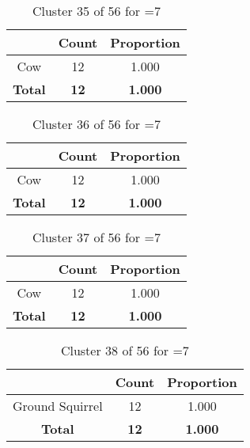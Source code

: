 \begin{table}[ht!]
\centering
\begin{tabular}{|c|c|c|}
\hline
\bf \Spec{} &\bf Count &\bf Proportion\\ \hline \hline
Cow & 12 & 1.000\\ \hline
\hline
\bf Total & \bf 12 & \bf 1.000\\ \hline
\end{tabular}
\label{tab:cluster:35:7}
\caption{Cluster 35 of 56 for \minneigh{}=7}
\end{table}

\begin{table}[ht!]
\centering
\begin{tabular}{|c|c|c|}
\hline
\bf \Spec{} &\bf Count &\bf Proportion\\ \hline \hline
Cow & 12 & 1.000\\ \hline
\hline
\bf Total & \bf 12 & \bf 1.000\\ \hline
\end{tabular}
\label{tab:cluster:36:7}
\caption{Cluster 36 of 56 for \minneigh{}=7}
\end{table}

\begin{table}[ht!]
\centering
\begin{tabular}{|c|c|c|}
\hline
\bf \Spec{} &\bf Count &\bf Proportion\\ \hline \hline
Cow & 12 & 1.000\\ \hline
\hline
\bf Total & \bf 12 & \bf 1.000\\ \hline
\end{tabular}
\label{tab:cluster:37:7}
\caption{Cluster 37 of 56 for \minneigh{}=7}
\end{table}

\begin{table}[ht!]
\centering
\begin{tabular}{|c|c|c|}
\hline
\bf \Spec{} &\bf Count &\bf Proportion\\ \hline \hline
Ground Squirrel & 12 & 1.000\\ \hline
\hline
\bf Total & \bf 12 & \bf 1.000\\ \hline
\end{tabular}
\label{tab:cluster:38:7}
\caption{Cluster 38 of 56 for \minneigh{}=7}
\end{table}

